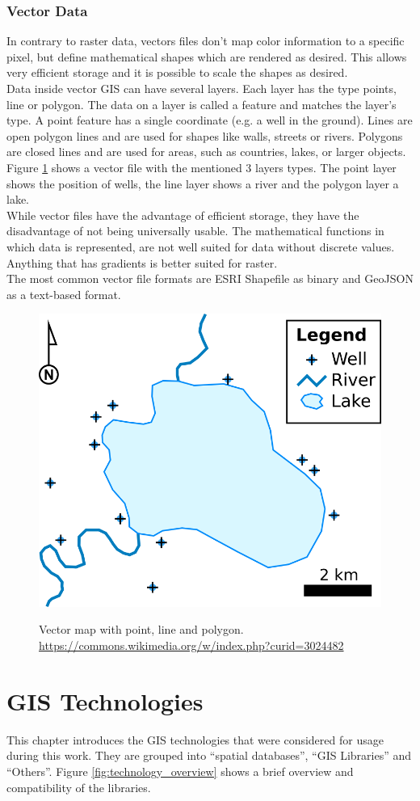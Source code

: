 \subsubsection{Vector Data}
In contrary to raster data, vectors files don't map color information to a specific pixel, but define mathematical shapes which are rendered as desired. This allows very efficient storage and it is possible to scale the shapes as desired.\\
Data inside vector GIS can have several layers. Each layer has the type points, line or polygon. The data on a layer is called a feature and matches the layer's type. A point feature has a single coordinate (e.g. a well in the ground). Lines are open polygon lines and are used for shapes like walls, streets or rivers. Polygons are closed lines and are used for areas, such as countries, lakes, or larger objects. Figure \ref{img:vector} shows a vector file with the mentioned 3 layers types. The point layer shows the position of wells, the line layer shows a river and the polygon layer a lake.\\
While vector files have the advantage of efficient storage, they have the disadvantage of not being universally usable. The mathematical functions in which data is represented, are not well suited for data without discrete values. Anything that has gradients is better suited for raster.\\
The most common vector file formats are ESRI Shapefile as binary and GeoJSON as a text-based format.

\begin{figure}[H]
	\centering
	\includegraphics[width=0.4\columnwidth]{res/vector-map}\\
	\caption[]{Vector map with point, line and polygon. \url{https://commons.wikimedia.org/w/index.php?curid=3024482}}
	\label{img:vector}
\end{figure}



\section{GIS Technologies}
This chapter introduces the GIS technologies that were considered for usage during this work. They are grouped into \enquote{spatial databases}, \enquote{GIS Libraries} and \enquote{Others}. Figure \ref{fig:technology_overview} shows a brief overview and compatibility of the libraries.

